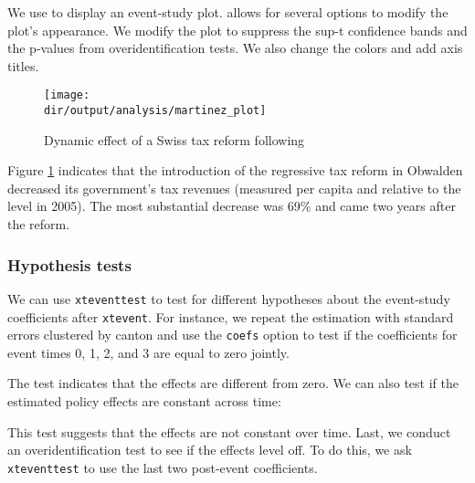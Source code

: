 \documentclass[12pt]{article}
\begin{document}
We use \xteventplot to display an event-study plot.
\xtevent allows for several options to modify the plot's  appearance.
We modify the plot to suppress the sup-t confidence bands and the p-values from overidentification tests.
We also change the colors and add axis titles.

\begin{stlog}
	\nullskip
\end{stlog}

\begin{figure}[h!]
	\begin{center}
		\texttt{[image: \\dir/output/analysis/martinez\_plot]}
	\end{center}
	\caption{Dynamic effect of a Swiss tax reform following \citet{martinez2022mobility}}
	\label{fig:martinez_default}
\end{figure}

Figure \ref{fig:martinez_default} indicates that the introduction of the regressive tax reform in Obwalden decreased its government's tax revenues (measured per capita and relative to the level in 2005).
The most substantial decrease was 69\% and came two years after the reform.

\subsubsection*{Hypothesis tests}

We can use \texttt{xteventtest} to test for different hypotheses about the event-study coefficients after \texttt{xtevent}.
For instance, we repeat the estimation with standard errors clustered by canton and use the \texttt{coefs} option to test if the coefficients for event times 0, 1, 2, and 3 are equal to zero jointly.

\begin{stlog}
	\nullskip
\end{stlog}
The test indicates that the effects are different from zero.
We can also test if the estimated policy effects are constant across time:

\begin{stlog}
	\nullskip
\end{stlog}

This test suggests that the effects are not constant over time.
Last, we conduct an overidentification test to see if the effects level off.
To do this, we ask \texttt{xteventtest} to use the last two post-event coefficients.
\end{document}
